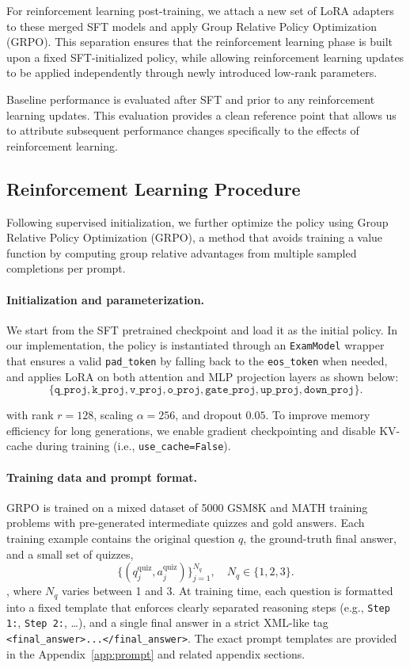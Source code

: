 \documentclass[12pt]{report}
\begin{document}
For reinforcement learning post-training, we attach a new set of LoRA adapters to these merged SFT models and apply Group Relative Policy Optimization (GRPO). This separation ensures that the reinforcement learning phase is built upon a fixed SFT-initialized policy, while allowing reinforcement learning updates to be applied independently through newly introduced low-rank parameters.

Baseline performance is evaluated after SFT and prior to any reinforcement learning updates. This evaluation provides a clean reference point that allows us to attribute subsequent performance changes specifically to the effects of reinforcement learning.

\subsection{Reinforcement Learning Procedure}
\label{sec:rl-procedure}

Following supervised initialization, we further optimize the policy using
Group Relative Policy Optimization (GRPO), a method that avoids
training a value function by computing group relative
advantages from multiple sampled completions per prompt.

\paragraph{Initialization and parameterization.}
We start from the SFT pretrained checkpoint and load it as the initial policy.
In our implementation, the policy is instantiated through an \texttt{ExamModel}
wrapper that ensures a valid \texttt{pad\_token} by falling back to the
\texttt{eos\_token} when needed, and applies LoRA on both attention and MLP projection layers as shown below:
\[
\{ \texttt{q\_proj}, \texttt{k\_proj}, \texttt{v\_proj}, \texttt{o\_proj},
   \texttt{gate\_proj}, \texttt{up\_proj}, \texttt{down\_proj} \}.
\]

with rank \(r=128\), scaling \(\alpha=256\), and dropout \(0.05\).
To improve memory efficiency for long generations, we enable gradient
checkpointing and disable KV-cache during training (i.e., \texttt{use\_cache=False}).

\paragraph{Training data and prompt format.}
\label{sec:training-data-and-prompt-format}
GRPO is trained on a mixed dataset of 5000 GSM8K and MATH training problems with pre-generated intermediate quizzes and gold answers. Each training example contains the original question $q$, the ground-truth final answer, and a small set of quizzes,
\[
\{(q_j^{\text{quiz}}, a_j^{\text{quiz}})\}_{j=1}^{N_q},
\quad N_q \in \{1,2,3\}.
\]
, where \(N_q\) varies between 1 and 3.
At training time, each question is formatted into a fixed template that enforces clearly separated reasoning steps (e.g., \texttt{Step 1:}, \texttt{Step 2:}, \dots), and a single final answer in a strict XML-like tag \texttt{<final\_answer>...</final\_answer>}.
The exact prompt templates are provided in the Appendix~\ref{app:prompt} and related appendix sections.
\end{document}
